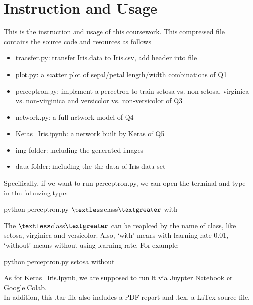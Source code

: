 \documentclass{article}
\begin{document}
\section{Instruction and Usage}
This is the instruction and usage of this coursework. This compressed file contains the source code and resources as follows:
\begin{itemize}
	\item transfer.py: transfer Iris.data to Iris.csv, add header into file
	\item plot.py: a scatter plot of sepal/petal length/width combinations of Q1
	\item perceptron.py: implement a percetron to train setosa vs. non-setosa, virginica vs. non-virginica and versicolor vs. non-versicolor of Q3
	\item network.py: a full network model of Q4
	\item Keras\_Iris.ipynb: a network built by Keras of Q5
	\item img folder: including the generated images
	\item data folder: including the the data of Iris data set
\end{itemize}
Specifically, if we want to run perceptron.py, we can open the terminal and type in the following type:
\begin{center}
python perceptron.py $\textless$class$\textgreater$ with
\end{center}
The $\textless$class$\textgreater$ can be reaplced by the name of class, like setosa, virginica and versicolor. Also, `with' means with learning rate 0.01, `without' means without using learning rate. For example:
\begin{center}
python perceptron.py setosa without
\end{center}
As for Keras\_Iris.ipynb, we are supposed to run it via Juypter Notebook or Google Colab.\\
In addition, this .tar file also includes a PDF report and .tex, a LaTex source file.
\end{document}
